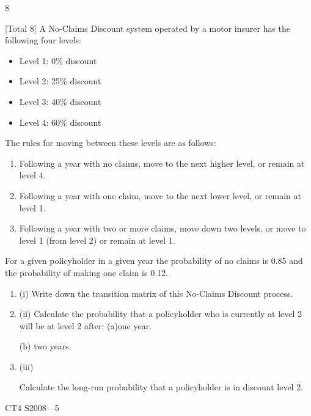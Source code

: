 \documentclass[a4paper,12pt]{article}
\begin{document}
8

[Total 8]
A No-Claims Discount system operated by a motor insurer has the following four
levels:

\begin{itemize}
\item Level 1: 0\% discount
\item Level 2: 25\% discount
\item Level 3: 40\% discount
\item Level 4: 60\% discount
\end{itemize}





The rules for moving between these levels are as follows:
\begin{enumerate}
\item Following a year with no claims, move to the next higher level, or remain at
level 4.
\item  Following a year with one claim, move to the next lower level, or remain at
level 1.
\item  Following a year with two or more claims, move down two levels, or move to
level 1 (from level 2) or remain at level 1.
\end{enumerate}
For a given policyholder in a given year the probability of no claims is 0.85 and the
probability of making one claim is 0.12.
\begin{enumerate}
\item (i) Write down the transition matrix of this No-Claims Discount process.
\item (ii) Calculate the probability that a policyholder who is currently at level 2 will be
at level 2 after:
(a)one year.

(b) two years.
\item (iii)



Calculate the long-run probability that a policyholder is in discount level 2.
\end{enumerate}
CT4 S2008—5

\newpage
\end{document}
